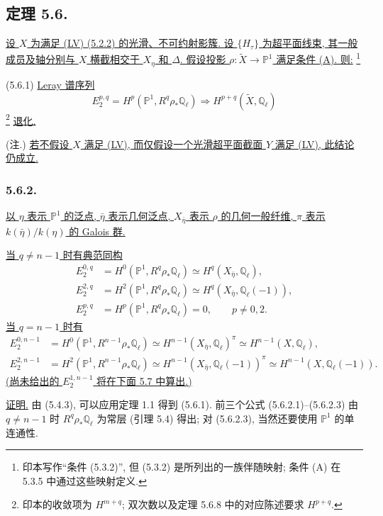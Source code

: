 \subsection*{定理 5.6.}
\underline{设 $X$ 为满足 (LV) (5.2.2) 的光滑、不可约射影簇. 设 $\{H_\tau\}$ 为超平面线束, 其一般成员及轴分别与 $X$ 横截相交于 $X_\eta$ 和 $\Delta$. 假设投影 $\rho:\widetilde X\to\mathbb P^1$ 满足条件 (A). 则:}
\footnote{印本写作“条件 (5.3.2)”, 但 (5.3.2) 是所列出的一族伴随映射; 条件 (A) 在 5.3.5 中通过这些映射定义.}

\smallskip
\noindent
\textup{(5.6.1)}\quad
\underline{Leray 谱序列}
\[
E_2^{p,q}=H^p(\mathbb P^1,R^q\rho_*\mathbb Q_\ell)
\Longrightarrow H^{p+q}(\widetilde X,\mathbb Q_\ell)
\]
\footnote{印本的收敛项为 $H^{m+q}$; 双次数以及定理 5.6.8 中的对应陈述要求 $H^{p+q}$.}
\underline{退化.}

\noindent
\textup{(注.)}\quad
\underline{若不假设 $X$ 满足 (LV), 而仅假设一个光滑超平面截面 $Y$ 满足 (LV), 此结论仍成立.}

\subsubsection*{5.6.2.}
\underline{以 $\eta$ 表示 $\mathbb P^1$ 的泛点, $\bar\eta$ 表示几何泛点, $X_{\bar\eta}$ 表示 $\rho$ 的几何一般纤维, $\pi$ 表示 $k(\bar\eta)/k(\eta)$ 的 Galois 群.}

\underline{当 $q\neq n-1$ 时有典范同构}
\begin{align}
E_2^{0,q}
 &=H^0(\mathbb P^1,R^q\rho_*\mathbb Q_\ell)
 \simeq H^q(X_{\bar\eta},\mathbb Q_\ell),
 \tag{5.6.2.1}\\
E_2^{2,q}
 &=H^2(\mathbb P^1,R^q\rho_*\mathbb Q_\ell)
 \simeq H^q(X_{\bar\eta},\mathbb Q_\ell(-1)),
 \tag{5.6.2.2}\\
E_2^{p,q}
 &=H^p(\mathbb P^1,R^q\rho_*\mathbb Q_\ell)=0,
 \qquad p\neq0,2.
 \tag{5.6.2.3}
\end{align}
\underline{当 $q=n-1$ 时有}
\begin{align}
E_2^{0,n-1}
 &=H^0(\mathbb P^1,R^{n-1}\rho_*\mathbb Q_\ell)
 \simeq H^{n-1}(X_{\bar\eta},\mathbb Q_\ell)^\pi
 \simeq H^{n-1}(X,\mathbb Q_\ell),
 \tag{5.6.2.4}\\
E_2^{2,n-1}
 &=H^2(\mathbb P^1,R^{n-1}\rho_*\mathbb Q_\ell)
 \simeq H^{n-1}(X_{\bar\eta},\mathbb Q_\ell(-1))^\pi
 \simeq H^{n-1}(X,\mathbb Q_\ell(-1)).
 \tag{5.6.2.5}
\end{align}
\underline{(尚未给出的 $E_2^{1,n-1}$ 将在下面 5.7 中算出.)}

\underline{证明.}
由 (5.4.3), 可以应用定理 1.1 得到 (5.6.1). 前三个公式 (5.6.2.1)--(5.6.2.3) 由 $q\neq n-1$ 时 $R^q\rho_*\mathbb Q_\ell$ 为常层 (引理 5.4) 得出; 对 (5.6.2.3), 当然还要使用 $\mathbb P^1$ 的单连通性.

